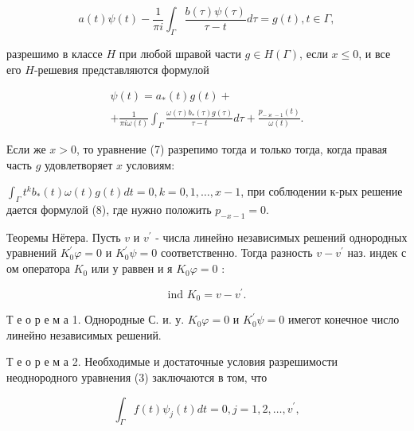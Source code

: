 \documentclass[10pt]{article}
\begin{document}
\[

a(t) \psi(t)-\frac{1}{\pi i} \int_{\Gamma} \frac{b(\tau) \psi(\tau)}{\tau-t} d \tau=g(t), t \in \Gamma,

\]



разрешимо в классе $H$ при любой шравой части $g \in H(\Gamma)$, если $x \leqslant 0$, и все его $H$-решевия представляются формулой



\[

\begin{gathered}

\psi(t)=a_{*}(t) g(t)+ \\

+\frac{1}{\pi i \omega(t)} \int_{\Gamma} \frac{\omega(\tau) b_{*}(\tau) g(\tau)}{\tau-t} d \tau+\frac{p_{-\varkappa-1}(t)}{\omega(t)} .

\end{gathered}

\]



Если же $x>0$, то уравнение (7) разрепимо тогда и только тогда, когда правая часть $g$ удовлетворяет $x$ условиям:



$\int_{\Gamma} t^{k} b_{*}(t) \omega(t) g(t) d t=0, k=0,1, \ldots, x-1$, при соблюдении к-рых решение дается формулой (8), где нужно положить $p_{-x-1}=0$.



Теоремы Нётера. Пусть $v$ и $v^{\prime}$ - числа линейно независимых решений однородных уравнений $K_{0}^{\prime} \varphi=0$ и $K_{0}^{\prime} \psi=0$ соответственно. Тогда разность $v-v^{\prime}$ наз. индек с ом оператора $K_{0}$ или у раввен и я $K_{0} \varphi=0$ :



\[

\text { ind } K_{0}=v-v^{\prime} \text {. }

\]



Т е о р е м а 1. Однородные С. и. у. $K_{0} \varphi=0$ и $K_{0}^{\prime} \psi=0$ имегот конечное число линейно независимых решений.



Т е о р е м а 2. Необходимые и достаточные условия разрешимости неоднородного уравнения (3) заключаются в том, что



\[

\int_{\Gamma} f(t) \psi_{j}(t) d t=0, j=1,2, \ldots, v^{\prime},

\]
\end{document}
